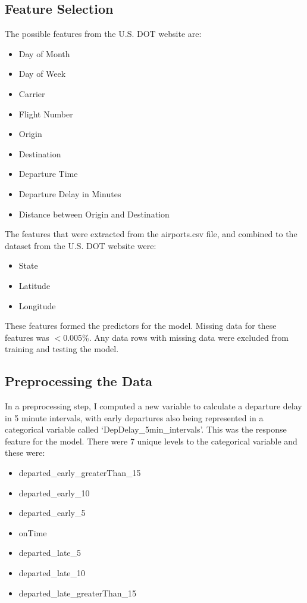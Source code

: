 \documentclass[a4paper, 10pt]{article}
\begin{document}
\subsection{Feature Selection}
The possible features from the U.S. DOT website are:
\begin{itemize}
\item{Day of Month}
\item{Day of Week}
\item{Carrier}
\item{Flight Number}
\item{Origin}
\item{Destination}
\item{Departure Time}
\item{Departure Delay in Minutes}
\item{Distance between Origin and Destination}
\end{itemize}

The features that were extracted from the airports.csv file, and combined to the dataset from the U.S. DOT website were:
\begin{itemize}
\item{State}
\item{Latitude}
\item{Longitude}
\end{itemize}

\vspace{5mm}
These features formed the predictors for the model. Missing data for these features was $<$0.005\%. Any data rows with missing data were excluded from training and testing the model. 

\subsection{Preprocessing the Data}
In a preprocessing step, I computed a new variable to calculate a departure delay in 5 minute intervals, with early departures also being represented in a categorical variable called `DepDelay\_5min\_intervals'. This was the response feature for the model. There were 7 unique levels to the categorical variable and these were:
\begin{itemize}
\item{departed\_early\_greaterThan\_15}
\item{departed\_early\_10}
\item{departed\_early\_5}
\item{onTime}
\item{departed\_late\_5}
\item{departed\_late\_10}
\item{departed\_late\_greaterThan\_15}
\end{itemize}
\end{document}
